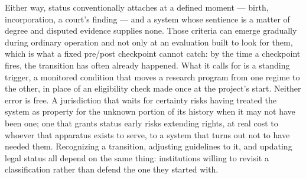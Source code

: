 Either way, status conventionally attaches at a defined moment — birth, incorporation, a court's finding — and a system whose sentience is a matter of degree and disputed evidence supplies none. Those criteria can emerge gradually during ordinary operation and not only at an evaluation built to look for them, which is what a fixed pre/post checkpoint cannot catch: by the time a checkpoint fires, the transition has often already happened. What it calls for is a standing trigger, a monitored condition that moves a research program from one regime to the other, in place of an eligibility check made once at the project's start. Neither error is free. A jurisdiction that waits for certainty risks having treated the system as property for the unknown portion of its history when it may not have been one; one that grants status early risks extending rights, at real cost to whoever that apparatus exists to serve, to a system that turns out not to have needed them. Recognizing a transition, adjusting guidelines to it, and updating legal status all depend on the same thing: institutions willing to revisit a classification rather than defend the one they started with.
